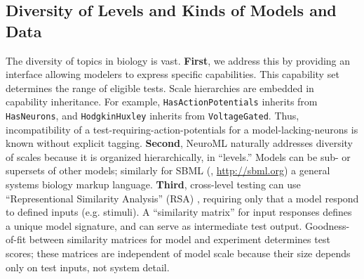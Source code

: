 \documentclass{frontiersSCNS}
\let\verbx\lstinline
\begin{document}
\subsection{Diversity of Levels and Kinds of Models and Data}
The diversity of topics in biology is vast. 
\textbf{First}, we address this by providing an interface allowing modelers to express specific capabilities.  
This capability set determines the range of eligible tests.  Scale hierarchies are embedded in capability inheritance. 
For example, \verbx{HasActionPotentials} inherits from \verbx{HasNeurons}, and \verbx{HodgkinHuxley} inherits from \verbx{VoltageGated}. 
Thus, incompatibility of a test-requiring-action-potentials for a model-lacking-neurons is known without explicit tagging. 
\textbf{Second}, NeuroML naturally addresses diversity of scales because it is organized hierarchically, in ``levels.''  
Models can be sub- or supersets of other models; similarly for SBML (\cite{hucka_systems_2003}, \url{http://sbml.org}) a general systems biology markup language. 
\textbf{Third}, cross-level testing can use ``Representional Similarity Analysis'' (RSA) \citep{kriegeskorte_representational_2008}, requiring only that a model respond to defined inputs (e.g. stimuli). 
A ``similarity matrix'' for input responses defines a unique model signature, and can serve as intermediate test output. 
Goodness-of-fit between similarity matrices for model and experiment determines test scores; 
these matrices are independent of model scale because their size depends only on test inputs, not system detail.  
\end{document}
